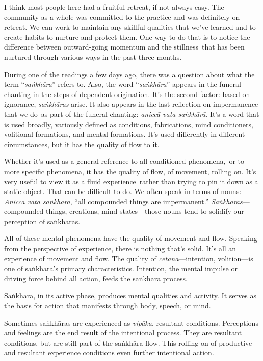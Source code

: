 I think most people here had a fruitful retreat, if not always easy. The community as a whole was committed to the practice and was definitely on retreat. We can work to maintain any skillful qualities that we've learned and to create habits to nurture and protect them. One way to do that is to notice the difference between outward-going momentum and the stillness~that has been nurtured through various ways in the past three months.~

During one of the readings a few days ago, there was a question about what the term ``\emph{saṅkhāra}'' refers to. Also, the word ``\emph{saṅkhāra}'' appears in the funeral chanting in the steps of dependent origination. It's the second factor: based on ignorance, \emph{saṅkhāras} arise. It also appears in the last reflection on impermanence that we do~as part of the funeral chanting: \emph{aniccā vata saṅkhārā}. It's a word that is used broadly, variously defined as conditions, fabrications, mind conditioners, volitional formations, and mental formations. It's used differently in different circumstances, but it has the quality of flow to it.

Whether it's used as a general reference to all conditioned phenomena,~or to more specific phenomena, it has the quality of flow, of movement, rolling on. It's very useful to view it as a fluid experience~rather than trying to pin it down as a static object. That can be difficult to do. We often speak in terms of nouns: \emph{Aniccā vata saṅkhārā}, ``all compounded things are impermanent.'' \emph{Saṅkhāras}---compounded things, creations, mind states---those nouns tend to solidify our perception of saṅkhāras.

All of these mental phenomena have the quality of movement and flow. Speaking from the perspective of experience, there is nothing that's solid. It's all an experience of movement and flow. The quality of \emph{cetanā}---intention, volition---is one of saṅkhāra's primary characteristics. Intention, the mental impulse or driving force behind all action, feeds the saṅkhāra process.~

Saṅkhāra, in its active phase, produces mental qualities and activity. It serves as the basis for action that manifests through body, speech, or mind.~

Sometimes saṅkhāras are experienced as \emph{vipāka}, resultant conditions. Perceptions and feelings are the end result of the intentional process. They are resultant conditions, but are still part of the saṅkhāra flow. This rolling on of productive and resultant experience conditions even further intentional action.~

